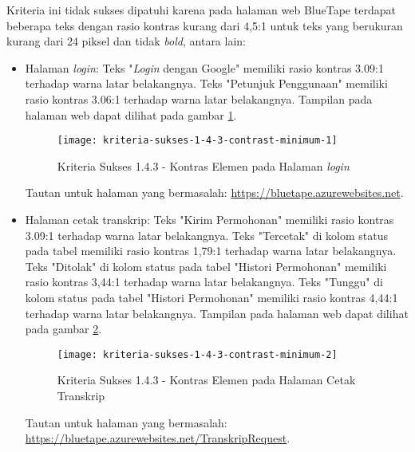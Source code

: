 Kriteria ini tidak sukses dipatuhi karena pada halaman web BlueTape terdapat beberapa teks dengan rasio kontras kurang dari 4,5:1 untuk teks yang berukuran kurang dari 24 piksel dan tidak \textit{bold}, antara lain:

\begin{itemize}
    \item Halaman \textit{login}: Teks "\textit{Login} dengan Google" memiliki rasio kontras 3.09:1 terhadap warna latar belakangnya. Teks "Petunjuk Penggunaan" memiliki rasio kontras 3.06:1 terhadap warna latar belakangnya. Tampilan pada halaman web dapat dilihat pada gambar \ref{fig:1.4.3_contrast_minimum_1}.
    \begin{figure}[H]
        \centering  
        \texttt{[image: kriteria-sukses-1-4-3-contrast-minimum-1]}  
        \caption[Kriteria Sukses 1.4.3 - Kontras Elemen pada Halaman \textit{login}]{Kriteria Sukses 1.4.3 - Kontras Elemen pada Halaman \textit{login}}
        \label{fig:1.4.3_contrast_minimum_1}  
    \end{figure} 
    Tautan untuk halaman yang bermasalah: \url{https://bluetape.azurewebsites.net}.

    \item Halaman cetak transkrip: Teks "Kirim Permohonan" memiliki rasio kontras 3.09:1 terhadap warna latar belakangnya. Teks "Tercetak" di kolom status pada tabel memiliki rasio kontras 1,79:1 terhadap warna latar belakangnya. Teks "Ditolak" di kolom status pada tabel "Histori Permohonan" memiliki rasio kontras 3,44:1 terhadap warna latar belakangnya. Teks "Tunggu" di kolom status pada tabel "Histori Permohonan" memiliki rasio kontras 4,44:1 terhadap warna latar belakangnya. Tampilan pada halaman web dapat dilihat pada gambar \ref{fig:1.4.3_contrast_minimum_2}.
    \begin{figure}[H]
        \centering  
        \texttt{[image: kriteria-sukses-1-4-3-contrast-minimum-2]}  
        \caption[Kriteria Sukses 1.4.3 - Kontras Elemen pada Halaman Cetak Transkrip]{Kriteria Sukses 1.4.3 - Kontras Elemen pada Halaman Cetak Transkrip}
        \label{fig:1.4.3_contrast_minimum_2}  
    \end{figure} 
    Tautan untuk halaman yang bermasalah: \url{https://bluetape.azurewebsites.net/TranskripRequest}.


\end{itemize}
